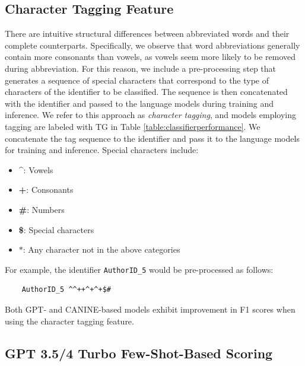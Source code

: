 \subsection{Character Tagging Feature}
There are intuitive structural differences between abbreviated words and their complete counterparts.
Specifically, we observe that word abbreviations generally contain more consonants than vowels, as vowels seem more likely to be removed during abbreviation.
For this reason, we include a pre-processing step that generates a sequence of special characters that correspond to the type of characters of the identifier to be classified. 
The sequence is then concatenated with the identifier and passed to the language models during training and inference.
We refer to this approach as \emph{character tagging}, and models employing tagging are labeled with TG in Table \ref{table:classifierperformance}.
We concatenate the tag sequence to the identifier and pass it to the language models for training and inference. Special characters include:
\begin{itemize}
  \item \textbf{\textasciicircum}: Vowels
  \item \textbf{+}: Consonants
  \item \textbf{\#}: Numbers
  \item \textbf{\$}: Special characters
  \item \textbf{$\ast$}: Any character not in the above categories
\end{itemize} 

For example, the identifier \texttt{AuthorID\_5} would be pre-processed as follows:

\begin{verbatim}
    AuthorID_5 ^^++^+^+$#
\end{verbatim}

Both GPT- and CANINE-based models exhibit improvement in F1 scores when using the character tagging feature.

\subsection{GPT 3.5/4 Turbo Few-Shot-Based Scoring}


